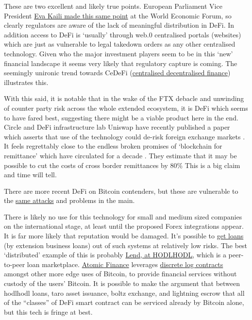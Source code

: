 These are two excellent and likely true points. European Parliament Vice President \href{https://cointelegraph.com/news/wef-2022-most-defi-protocols-aren-t-really-decentralized-says-european-parliament-vp?}{Eva Kaili made this same point} at the World Economic Forum, so clearly regulators are aware of the lack of meaningful distribution in DeFi. In addition access to DeFi is `usually' through web.0 centralised portals (websites) which are just as vulnerable to legal takedown orders as any other centralised technology. Given who the major investment players seem to be in this `new' financial landscape it seems very likely that regulatory capture is coming. The seemingly unironic trend towards CeDeFi (\href{https://www.nasdaq.com/articles/cedefi-what-it-is-and-why-it-matters}{centralised decentralised finance}) illustrates this.\par
With this said, it is notable that in the wake of the FTX debacle and unwinding of counter party risk across the whole extended ecosystem, it is DeFi which seems to have fared best, suggesting there might be a viable product here in the end. Circle and DeFi infrastructure lab Uniswap have recently published a paper which asserts that use of the technology could de-risk foreign exchange markets \cite{Adams2023}. It feels regrettably close to the endless broken promises of `blockchain for remittance' which have circulated for a decade \cite{sood2019implementation, bechtel2022future}. They estimate that it may be possible to cut the costs of cross border remittances by 80\% This is a big claim and time will tell.\par 
There are more recent DeFi on Bitcoin contenders, but these are vulnerable to the \href{https://bisq.community/t/trading-halted-until-v1-3-0-hotfix/9208}{same attacks} and problems in the main. \par 
There is likely no use for this technology for small and medium sized companies on the international stage, at least until the proposed Forex integrations appear. It is far more likely that reputation would be damaged. It's possible to \href{https://www.coindesk.com/layer2/2022/07/20/the-credit-crunch-is-not-the-end-of-crypto-lending/}{get loans} (by extension business loans) out of such systems at relatively low risks. The best `distributed' example of this is probably \href{https://lend.hodlhodl.com/}{Lend, at HODLHODL}, which is a peer-to-peer loan marketplace. \href{https://atomic.finance/blog/a-laypersons-guide-to-discreet-log-contracts-atomic-yield-series-part-3/}{Atomic Finance} leverages \href{https://adiabat.github.io/dlc.pdf}{discrete log contracts} amongst other more edge uses of Bitcoin, to provide financial services without custody of the users' Bitcoin. It is possible to make the argument that between hodlhodl loans, taro asset issuance, boltz exchange, and lightning escrow that all of the ``classes'' of DeFi smart contract can be serviced already by Bitcoin alone, but this tech is fringe at best.\par

